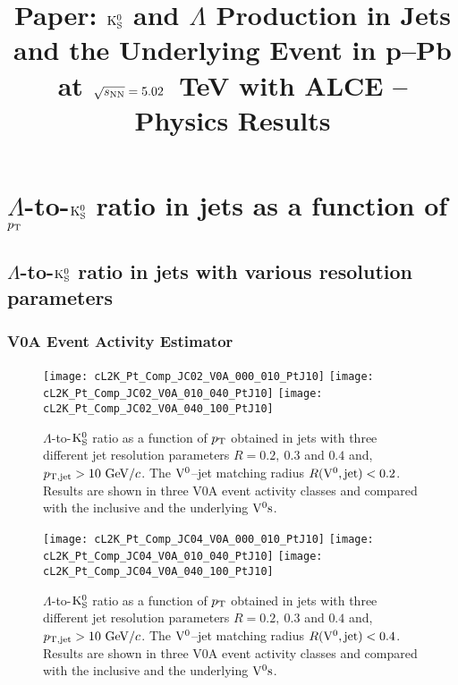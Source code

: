 \documentclass[12pt]{article}
\title{Paper: ${\rm K}_{\rm S}^{0}$ and $\Lambda$ Production in Jets and the Underlying
  Event in p--Pb at $\sqrt{s_{\rm NN}}=5.02$~TeV with ALCE -- Physics Results}
\author{}
\date{}
\begin{document}
\maketitle
\tableofcontents

\newpage
\listoffigures

\newpage
\section{$\Lambda$-to-${\rm K}_{\rm S}^{0}$ ratio in jets as a function of $p_{\rm T}$}

\subsection{$\Lambda$-to-${\rm K}_{\rm S}^{0}$ ratio in jets with various resolution parameters}

\subsubsection{V0A Event Activity Estimator}

\begin{figure}[htbp]
\centering
\texttt{[image: cL2K\_Pt\_Comp\_JC02\_V0A\_000\_010\_PtJ10]}
\texttt{[image: cL2K\_Pt\_Comp\_JC02\_V0A\_010\_040\_PtJ10]}
\texttt{[image: cL2K\_Pt\_Comp\_JC02\_V0A\_040\_100\_PtJ10]}
\caption{$\Lambda$-to-${\rm K}_{\rm S}^{0}$ ratio as a function of $p_{\rm T}$
  obtained in jets with three different jet resolution
  parameters $R=0.2,~0.3$ and $0.4$ and, $p_{\rm T,jet}>10~{\rm GeV}/c$.
  The ${\rm V}^{0}$--jet matching radius $R({\rm V}^{0},{\rm jet})<0.2$.
  Results are shown in three V0A event activity classes and
  compared with the inclusive and the underlying ${\rm V}^{0}{\rm s}$.}
\label{fig:s01L2KJC02V0APtj10}
\end{figure}

\begin{figure}[htbp]
\centering
\texttt{[image: cL2K\_Pt\_Comp\_JC04\_V0A\_000\_010\_PtJ10]}
\texttt{[image: cL2K\_Pt\_Comp\_JC04\_V0A\_010\_040\_PtJ10]}
\texttt{[image: cL2K\_Pt\_Comp\_JC04\_V0A\_040\_100\_PtJ10]}
\caption{$\Lambda$-to-${\rm K}_{\rm S}^{0}$ ratio as a function of $p_{\rm T}$
  obtained in jets with three different jet resolution
  parameters $R=0.2,~0.3$ and $0.4$ and, $p_{\rm T,jet}>10~{\rm GeV}/c$.
  The ${\rm V}^{0}$--jet matching radius $R({\rm V}^{0},{\rm jet})<0.4$.
  Results are shown in three V0A event activity classes and
  compared with the inclusive and the underlying ${\rm V}^{0}{\rm s}$.}
\label{fig:s01L2KJC04V0APtj10}
\end{figure}
\end{document}

